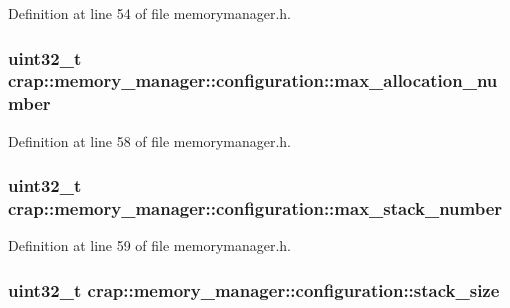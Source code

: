 Definition at line 54 of file memorymanager.\+h.

\hypertarget{structcrap_1_1memory__manager_1_1configuration_a793bafe39295d86d3dda7b2406678ee2}{
\subsubsection[{max\+\_\+allocation\+\_\+number}]{\setlength{\rightskip}{0pt plus 5cm}uint32\+\_\+t crap\+::memory\+\_\+manager\+::configuration\+::max\+\_\+allocation\+\_\+number}}\label{structcrap_1_1memory__manager_1_1configuration_a793bafe39295d86d3dda7b2406678ee2}


Definition at line 58 of file memorymanager.\+h.

\hypertarget{structcrap_1_1memory__manager_1_1configuration_ae29f9aa318e67c99b5a8a008b9971fcd}{
\subsubsection[{max\+\_\+stack\+\_\+number}]{\setlength{\rightskip}{0pt plus 5cm}uint32\+\_\+t crap\+::memory\+\_\+manager\+::configuration\+::max\+\_\+stack\+\_\+number}}\label{structcrap_1_1memory__manager_1_1configuration_ae29f9aa318e67c99b5a8a008b9971fcd}


Definition at line 59 of file memorymanager.\+h.

\hypertarget{structcrap_1_1memory__manager_1_1configuration_ab2398e2eef2484e19c711e4a5afade26}{
\subsubsection[{stack\+\_\+size}]{\setlength{\rightskip}{0pt plus 5cm}uint32\+\_\+t crap\+::memory\+\_\+manager\+::configuration\+::stack\+\_\+size}}\label{structcrap_1_1memory__manager_1_1configuration_ab2398e2eef2484e19c711e4a5afade26}


